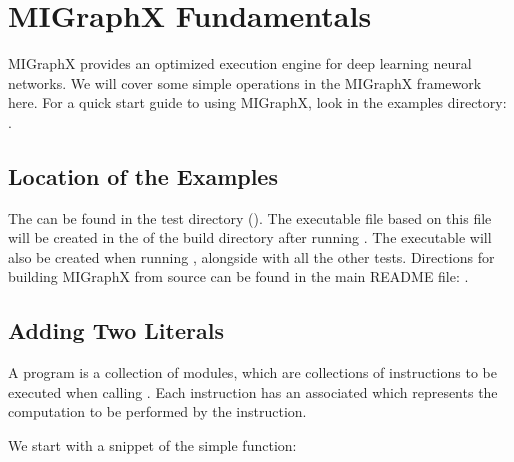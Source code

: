 \documentclass[letterpaper,10pt,english]{sphinxmanual}
\begin{document}
\section{MIGraphX Fundamentals}
\label{\detokenize{dev_intro:migraphx-fundamentals}}\label{\detokenize{dev_intro::doc}}
\sphinxAtStartPar
MIGraphX provides an optimized execution engine for deep learning neural networks.
We will cover some simple operations in the MIGraphX framework here.
For a quick start guide to using MIGraphX, look in the examples directory: .


\subsection{Location of the Examples}
\label{\detokenize{dev_intro:location-of-the-examples}}
\sphinxAtStartPar
The  can be found in the test directory ().
The executable file  based on this file will be created in the  of the build directory after running .
The executable will also be created when running , alongside with all the other tests.
Directions for building MIGraphX from source can be found in the main README file: .


\subsection{Adding Two Literals}
\label{\detokenize{dev_intro:adding-two-literals}}
\sphinxAtStartPar
A program is a collection of modules, which are collections of instructions to be executed when calling .
Each instruction has an associated  which represents the computation to be performed by the instruction.

\sphinxAtStartPar
We start with a snippet of the simple  function:
\end{document}
